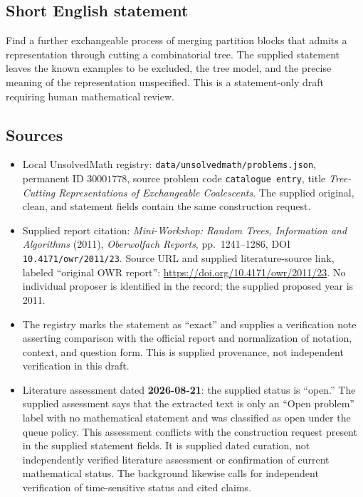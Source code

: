 \documentclass[11pt]{article}
\begin{document}
\subsection{Short English statement}
Find a further exchangeable process of merging partition blocks that admits a representation through cutting a combinatorial tree. The supplied statement leaves the known examples to be excluded, the tree model, and the precise meaning of the representation unspecified. This is a statement-only draft requiring human mathematical review.
\subsection{Sources}
\begin{itemize}
\item Local UnsolvedMath registry: \texttt{data/unsolvedmath/problems.json}, permanent ID \(30001778\), source problem code \texttt{catalogue entry}, title \emph{Tree-Cutting Representations of Exchangeable Coalescents}. The supplied original, clean, and statement fields contain the same construction request.
\item Supplied report citation: \emph{Mini-Workshop: Random Trees, Information and Algorithms} (2011), \emph{Oberwolfach Reports}, pp.\ 1241--1286, DOI \texttt{10.4171/owr/2011/23}. Source URL and supplied literature-source link, labeled ``original OWR report'': \url{https://doi.org/10.4171/owr/2011/23}. No individual proposer is identified in the record; the supplied proposed year is 2011.
\item The registry marks the statement as ``exact'' and supplies a verification note asserting comparison with the official report and normalization of notation, context, and question form. This is supplied provenance, not independent verification in this draft.
\item Literature assessment dated \textbf{2026-08-21}: the supplied status is ``open.'' The supplied assessment says that the extracted text is only an ``Open problem'' label with no mathematical statement and was classified as open under the queue policy. This assessment conflicts with the construction request present in the supplied statement fields. It is supplied dated curation, not independently verified literature assessment or confirmation of current mathematical status. The background likewise calls for independent verification of time-sensitive status and cited claims.
\end{itemize}
\end{document}
